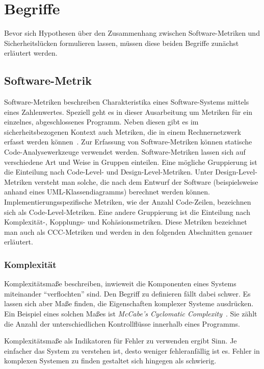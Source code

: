 \section{Begriffe}
\label{sec:begriffe}
Bevor sich Hypothesen über den Zusammenhang zwischen Software-Metriken und Sicherheitslücken formulieren lassen, müssen diese beiden Begriffe zunächst erläutert werden.

\subsection{Software-Metrik}
Software-Metriken beschreiben Charakteristika eines Software-Systems mittels eines Zahlenwertes.
Speziell geht es in dieser Ausarbeitung um Metriken für ein einzelnes, abgeschlossenes Programm.
Neben diesen gibt es im sicherheitsbezogenen Kontext auch Metriken, die in einem Rechnernetzwerk erfasst werden können~\cite{cheng2014}.
Zur Erfassung von Software-Metriken können statische Code-Analysewerkzeuge verwendet werden.
Software-Metriken lassen sich auf verschiedene Art und Weise in Gruppen einteilen.
Eine mögliche Gruppierung ist die Einteilung nach Code-Level- und Design-Level-Metriken.
Unter Design-Level-Metriken versteht man solche, die nach dem Entwurf der Software (beispielsweise anhand eines UML-Klassendiagramms) berechnet werden können.
Implementierungsspezifische Metriken, wie der Anzahl Code-Zeilen, bezeichnen sich als Code-Level-Metriken.
Eine andere Gruppierung ist die Einteilung nach Komplexität-, Kopplungs- und Kohäsionsmetriken.
Diese Metriken bezeichnet man auch als CCC-Metriken und werden in den folgenden Abschnitten genauer erläutert.

\subsubsection{Komplexität}
Komplexitätsmaße beschreiben, inwieweit die Komponenten eines Systems miteinander "`verflochten"' sind.
Den Begriff zu definieren fällt dabei schwer.
Es lassen sich aber Maße finden, die Eigenschaften komplexer Systeme ausdrücken.
Ein Beispiel eines solchen Maßes ist \textit{McCabe's Cyclomatic Complexity}~\cite{mccabe1976}.
Sie zählt die Anzahl der unterschiedlichen Kontrollflüsse innerhalb eines Programms.

Komplexitätsmaße als Indikatoren für Fehler zu verwenden ergibt Sinn.
Je einfacher das System zu verstehen ist, desto weniger fehleranfällig ist es.
Fehler in komplexen Systemen zu finden gestaltet sich hingegen als schwierig.

